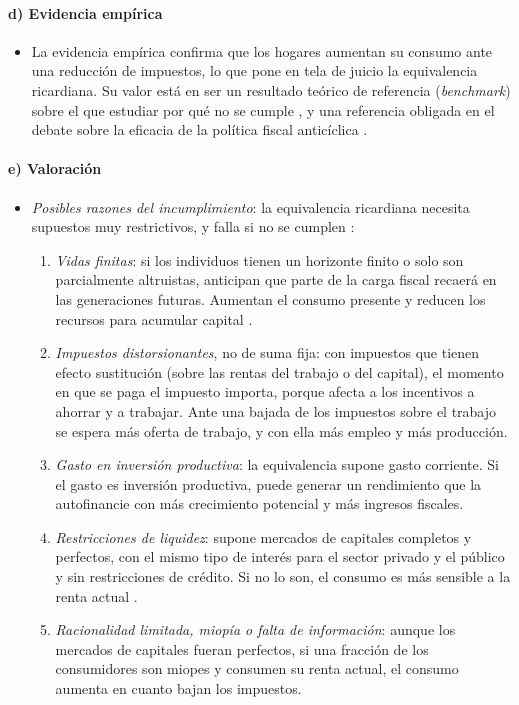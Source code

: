\documentclass[11pt]{article}
\begin{document}
\paragraph{d) Evidencia empírica}

\begin{itemize}
\item La evidencia empírica confirma que los hogares aumentan su consumo ante una reducción de impuestos, lo que pone en tela de juicio la equivalencia ricardiana. Su valor está en ser un resultado teórico de referencia (\emph{benchmark}) sobre el que estudiar por qué no se cumple , y una referencia obligada en el debate sobre la eficacia de la política fiscal anticíclica .
\end{itemize}

\paragraph{e) Valoración}

\begin{itemize}
\item \emph{Posibles razones del incumplimiento}: la equivalencia ricardiana necesita supuestos muy restrictivos, y falla si no se cumplen\nocite{Heijdra2017Foundations} :
  \begin{enumerate}[label=\roman*)]
  \item \emph{Vidas finitas}: si los individuos tienen un horizonte finito o solo son parcialmente altruistas, anticipan que parte de la carga fiscal recaerá en las generaciones futuras\nocite{Blanchard1985Debt}. Aumentan el consumo presente y reducen los recursos para acumular capital .
  \item \emph{Impuestos distorsionantes}, no de suma fija: con impuestos que tienen efecto sustitución (sobre las rentas del trabajo o del capital), el momento en que se paga el impuesto importa, porque afecta a los incentivos a ahorrar y a trabajar. Ante una bajada de los impuestos sobre el trabajo se espera más oferta de trabajo, y con ella más empleo y más producción.
  \item \emph{Gasto en inversión productiva}: la equivalencia supone gasto corriente. Si el gasto es inversión productiva, puede generar un rendimiento que la autofinancie con más crecimiento potencial y más ingresos fiscales.
  \item \emph{Restricciones de liquidez}:  supone mercados de capitales completos y perfectos, con el mismo tipo de interés para el sector privado y el público y sin restricciones de crédito. Si no lo son, el consumo es más sensible a la renta actual .
  \item \emph{Racionalidad limitada, miopía o falta de información}: aunque los mercados de capitales fueran perfectos, si una fracción de los consumidores son miopes y consumen su renta actual, el consumo aumenta en cuanto bajan los impuestos\nocite{CampbellMankiw1989Consumption}.
  \end{enumerate}
\end{itemize}
\end{document}

